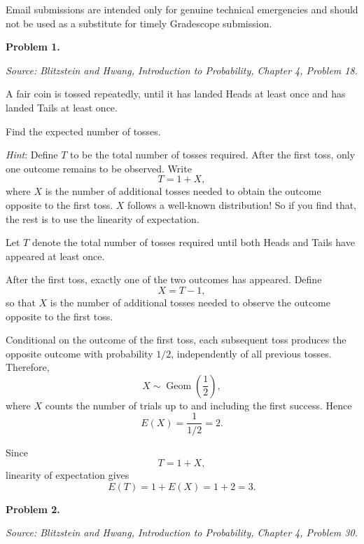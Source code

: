 \documentclass[11pt]{article}
\newcommand{\source}[1]{%
    \vspace{0.15cm}
    {\small\textit{Source: Blitzstein and Hwang, \textit{Introduction to Probability}, Chapter 4, Problem #1.}}
}
\begin{document}
Email submissions are intended only for genuine technical emergencies and should not be used as a substitute for timely Gradescope submission.

\newpage



\begin{problemheader}
\textbf{Problem 1.}
\end{problemheader}
\source{18}

A fair coin is tossed repeatedly, until it has landed Heads at least once and has landed Tails at least once.

Find the expected number of tosses.

 
 
\textit{Hint}: Define \(T\) to be the total number of tosses required. After the first toss,
only one outcome remains to be observed. Write
\[
T=1+X,
\]
where \(X\) is the number of additional tosses needed to obtain the outcome
opposite to the first toss. $X$ follows a well-known distribution! So if you find that, the rest is to use the linearity of expectation.
 
 

\begin{solutionbox}
Let \(T\) denote the total number of tosses required until both Heads and Tails
have appeared at least once.

After the first toss, exactly one of the two outcomes has appeared. Define
\[
X=T-1,
\]
so that \(X\) is the number of additional tosses needed to observe the outcome
opposite to the first toss.

Conditional on the outcome of the first toss, each subsequent toss produces the
opposite outcome with probability \(1/2\), independently of all previous tosses.
Therefore,
\[
X\sim \operatorname{Geom}\left(\frac12\right),
\]
where \(X\) counts the number of trials up to and including the first success.
Hence
\[
E(X)=\frac{1}{1/2}=2.
\]

Since
\[
T=1+X,
\]
linearity of expectation gives
\[
E(T)=1+E(X)=1+2=3.
\]

 
\end{solutionbox}
\newpage
 


\begin{problemheader}
\textbf{Problem 2. }
\end{problemheader}
\source{30}
\end{document}

